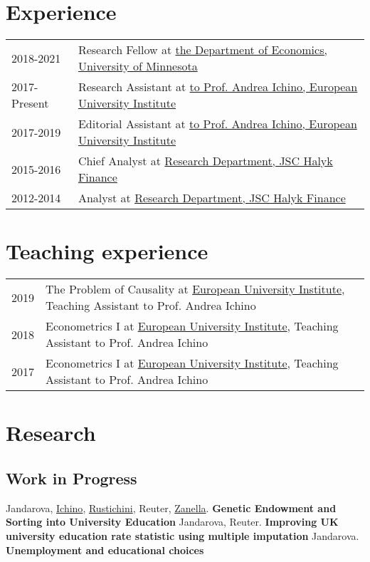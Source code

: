 \documentclass{article}
\begin{document}
    \section*{Experience}
  \begin{table}[H]
      \begin{tabular}{p{2cm}p{14cm}}
          2018-2021 & Research Fellow at \href{https://cla.umn.edu/economics}{the Department of Economics, University of Minnesota} \\
          2017-Present & Research Assistant at \href{https://www.eui.eu}{to Prof. Andrea Ichino, European University Institute} \\
          2017-2019 & Editorial Assistant at \href{https://www.eui.eu}{to Prof. Andrea Ichino, European University Institute} \\
          2015-2016 & Chief Analyst at \href{https://www.halykfinance.kz}{Research Department, JSC Halyk Finance} \\
          2012-2014 & Analyst at \href{https://www.halykfinance.kz}{Research Department, JSC Halyk Finance} \\
      \end{tabular}
    \end{table}


    \section*{Teaching experience}
  \begin{table}[H]
      \begin{tabular}{p{2cm}p{14cm}}
          2019 & {The Problem of Causality} at \href{https://www.eui.eu}{European University Institute}, Teaching Assistant to Prof. Andrea Ichino\\
          2018 & {Econometrics I} at \href{https://www.eui.eu}{European University Institute}, Teaching Assistant to Prof. Andrea Ichino\\
          2017 & {Econometrics I} at \href{https://www.eui.eu}{European University Institute}, Teaching Assistant to Prof. Andrea Ichino\\
      \end{tabular}
    \end{table}


    \section*{Research}\subsection*{Work in Progress}
      Jandarova, \href{http://www.andreaichino.it}{Ichino}, \href{https://sites.google.com/site/aldorustichini/}{Rustichini}, Reuter, \href{https://sites.google.com/site/giuliozanella/}{Zanella}. \textbf{Genetic Endowment and Sorting into University Education}
      Jandarova, Reuter. \textbf{Improving UK university education rate statistic using multiple imputation}
      Jandarova. \textbf{Unemployment and educational choices}
\end{document}
